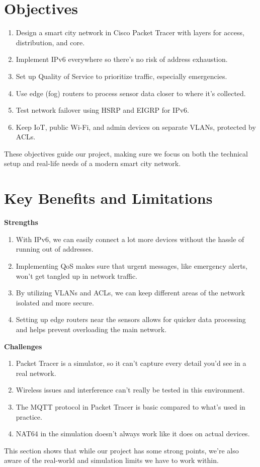 \documentclass[12pt,a4paper]{article}
\begin{document}
\section*{Objectives}
\begin{enumerate}[label=3.\arabic*, nosep]
    \item Design a smart city network in Cisco Packet Tracer with layers for access, distribution, and core.
    \item Implement IPv6 everywhere so there’s no risk of address exhaustion.
    \item Set up Quality of Service to prioritize traffic, especially emergencies.
    \item Use edge (fog) routers to process sensor data closer to where it’s collected.
    \item Test network failover using HSRP and EIGRP for IPv6.
    \item Keep IoT, public Wi-Fi, and admin devices on separate VLANs, protected by ACLs.
\end{enumerate}
These objectives guide our project, making sure we focus on both the technical setup and real-life needs of a modern smart city network.

\newpage

\section*{Key Benefits and Limitations}

\textbf{Strengths}
\begin{enumerate}[label=4.\arabic*, nosep]
    \item With IPv6, we can easily connect a lot more devices without the hassle of running out of addresses.
    \item Implementing QoS makes sure that urgent messages, like emergency alerts, won’t get tangled up in network traffic.
    \item By utilizing VLANs and ACLs, we can keep different areas of the network isolated and more secure.
    \item Setting up edge routers near the sensors allows for quicker data processing and helps prevent overloading the main network.
\end{enumerate}
\textbf{Challenges}
\begin{enumerate}[label=4.\arabic*, nosep]
    \item Packet Tracer is a simulator, so it can’t capture every detail you’d see in a real network.
    \item Wireless issues and interference can’t really be tested in this environment.
    \item The MQTT protocol in Packet Tracer is basic compared to what’s used in practice.
    \item NAT64 in the simulation doesn’t always work like it does on actual devices.
\end{enumerate}
This section shows that while our project has some strong points, we’re also aware of the real-world and simulation limits we have to work within.
\end{document}
